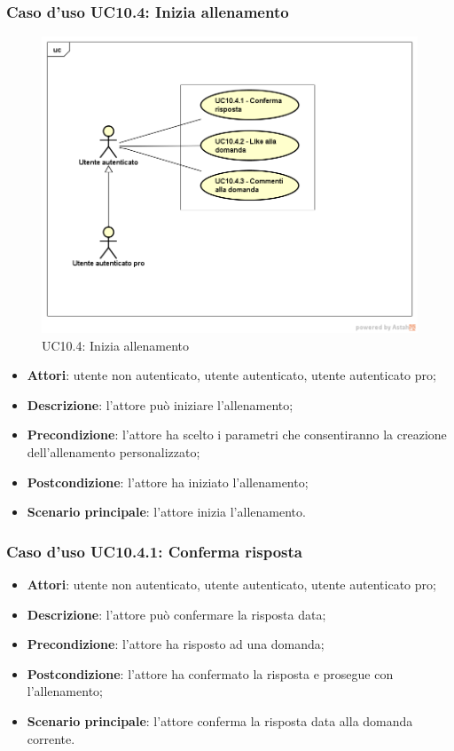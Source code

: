 \subsubsection{Caso d'uso UC10.4: Inizia allenamento}
\label{UC10.4}
\begin{figure}
	\centering
	\includegraphics[scale=0.5]{UML/UC10_4.png}
	\caption{UC10.4: Inizia allenamento}
\end{figure}
\FloatBarrier
	\begin{itemize}
		\item \textbf{Attori}: utente non autenticato, utente autenticato, utente autenticato pro;
		\item \textbf{Descrizione}: l'attore può iniziare l'allenamento;
		\item \textbf{Precondizione}: l'attore ha scelto i parametri che consentiranno la creazione dell'allenamento personalizzato;
		\item \textbf{Postcondizione}: l'attore ha iniziato l'allenamento;
		\item \textbf{Scenario principale}: l'attore inizia l'allenamento.
	\end{itemize}
	
\subsubsection{Caso d'uso UC10.4.1: Conferma risposta}
	\begin{itemize}
		\item \textbf{Attori}: utente non autenticato, utente autenticato, utente autenticato pro;
		\item \textbf{Descrizione}: l'attore può confermare la risposta data;
		\item \textbf{Precondizione}: l'attore ha risposto ad una domanda;
		\item \textbf{Postcondizione}: l'attore ha confermato la risposta e prosegue con l'allenamento;
		\item \textbf{Scenario principale}: l'attore conferma la risposta data alla domanda corrente.
	\end{itemize}
	
